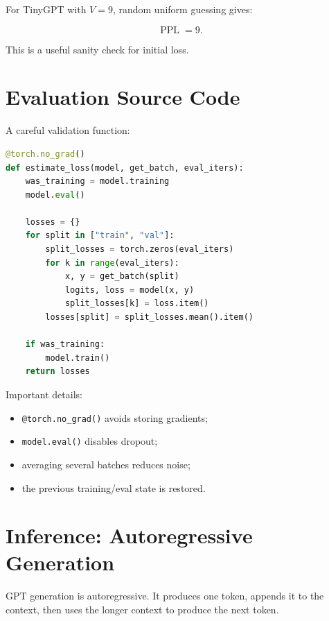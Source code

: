 For TinyGPT with \(V=9\), random uniform guessing gives:

\[
\operatorname{PPL}=9.
\]

This is a useful sanity check for initial loss.

\section{Evaluation Source Code}

A careful validation function:

\begin{lstlisting}[language=Python]
@torch.no_grad()
def estimate_loss(model, get_batch, eval_iters):
    was_training = model.training
    model.eval()

    losses = {}
    for split in ["train", "val"]:
        split_losses = torch.zeros(eval_iters)
        for k in range(eval_iters):
            x, y = get_batch(split)
            logits, loss = model(x, y)
            split_losses[k] = loss.item()
        losses[split] = split_losses.mean().item()

    if was_training:
        model.train()
    return losses
\end{lstlisting}

Important details:

\begin{itemize}
  \item \texttt{@torch.no\_grad()} avoids storing gradients;
  \item \texttt{model.eval()} disables dropout;
  \item averaging several batches reduces noise;
  \item the previous training/eval state is restored.
\end{itemize}

\section{Inference: Autoregressive Generation}

GPT generation is autoregressive. It produces one token, appends it to the context, then uses the longer context to produce the next token.

